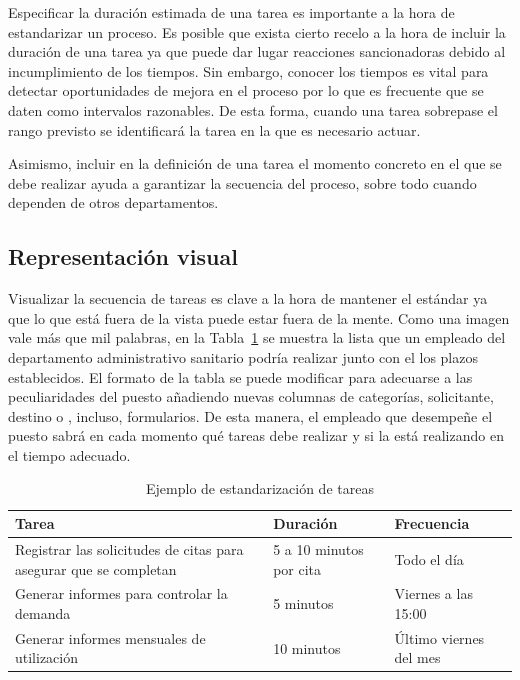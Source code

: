 Especificar la duración estimada de una tarea es importante a la hora de estandarizar un proceso.
Es posible que exista cierto recelo a la hora de incluir la duración de una tarea ya que puede dar lugar reacciones sancionadoras debido al incumplimiento de los tiempos.
Sin embargo, conocer los tiempos es vital para detectar oportunidades de mejora en el proceso por lo que es frecuente que se daten como intervalos razonables.
De esta forma, cuando una tarea sobrepase el rango previsto se identificará la tarea en la que es necesario actuar.

Asimismo, incluir en la definición de una tarea el momento concreto en el que se debe realizar ayuda a garantizar la secuencia del proceso, sobre todo cuando dependen de otros departamentos.

\subsection{Representación visual}

Visualizar la secuencia de tareas es clave a la hora de mantener el estándar ya que lo que está fuera de la vista puede estar fuera de la mente. Como una imagen vale más que mil palabras, en la Tabla~\ref{tab:ejemplo-estandar} se muestra la lista que un empleado del departamento administrativo sanitario podría realizar junto con el los plazos establecidos.
El formato de la tabla se puede modificar para adecuarse a las peculiaridades del puesto añadiendo nuevas columnas de categorías, solicitante, destino o , incluso, formularios.
De esta manera, el empleado que desempeñe el puesto sabrá en cada momento qué tareas debe realizar y si la está realizando en el tiempo adecuado.

\begin{table}
    \centering
    \begin{tabular}{p{5cm}ll}
        \toprule
        Tarea                                                             & Duración                & Frecuencia             \\
        \midrule
        Registrar las solicitudes de citas para asegurar que se completan & 5 a 10 minutos por cita & Todo el día            \\
        Generar informes para controlar la demanda                        & 5 minutos               & Viernes a las 15:00    \\
        Generar informes mensuales de utilización                         & 10 minutos              & Último viernes del mes \\
        \bottomrule
    \end{tabular}
    \caption{Ejemplo de estandarización de tareas}
    \label{tab:ejemplo-estandar}
\end{table}

